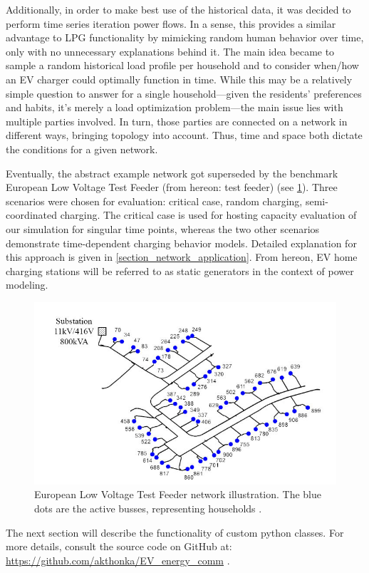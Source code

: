 \documentclass[a4paper,10pt]{report}
\begin{document}
Additionally, in order to make best use of the historical data, it was decided to perform time series iteration power flows. In a sense, this provides a similar advantage to LPG functionality by mimicking random human behavior over time, only with no unnecessary explanations behind it. The main idea became to sample a random historical load profile per household and to consider when/how an EV charger could optimally function in time. While this may be a relatively simple question to answer for a single household---given the residents' preferences and habits, it's merely a load optimization problem---the main issue lies with multiple parties involved. In turn, those parties are connected on a network in different ways, bringing topology into account. Thus, time and space both dictate the conditions for a given network.

Eventually, the abstract example network got superseded by the benchmark European Low Voltage Test Feeder (from hereon: test feeder) (see \cref{EU_LV_test_feeder}). Three scenarios were chosen for evaluation: critical case, random charging, semi-coordinated charging. The critical case is used for hosting capacity evaluation of our simulation for singular time points, whereas the two other scenarios demonstrate time-dependent charging behavior models. Detailed explanation for this approach is given in \cref{section_network_application}. From hereon, EV home charging stations will be referred to as static generators in the context of power modeling.

\begin{figure}[htpb]
	\centering
	\includegraphics[width=0.6\linewidth]{EU_LV_test_feeder}
	\caption{European Low Voltage Test Feeder network illustration. The blue dots are the active busses, representing households \cite{Nousdilis2017}.}
	\label{EU_LV_test_feeder}
\end{figure}

The next section will describe the functionality of custom python classes. For more details, consult the source code on GitHub at: \url{https://github.com/akthonka/EV_energy_comm} .
\end{document}
